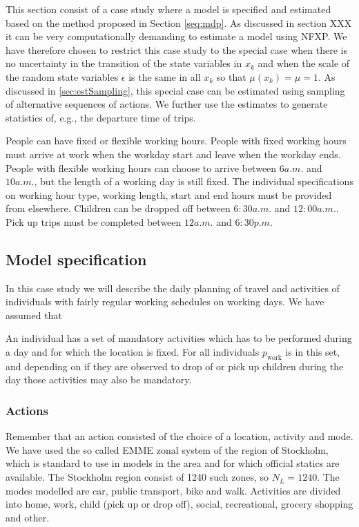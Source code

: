 This section consist of a case study where a model is specified and estimated based on the method proposed in Section \ref{seq:mdp}.
As discussed in section XXX %
it can be very computationally demanding to estimate a model using NFXP. We have therefore chosen to restrict this case study to the special case when there is no uncertainty in the transition of the state variables in $x_k$ and when the scale of the random state variables $\epsilon$ is the same in all $x_k$ so that $\mu(x_k)=\mu=1$. As discussed in \ref{sec:estSampling}, this special case can be estimated using sampling of alternative sequences of actions. We further use the estimates to generate statistics of, e.g., the departure time of trips. 



People can have fixed or flexible working hours. People with fixed working hours must arrive at work when the workday start and leave when the workday ends. %
People with flexible working hours can choose to arrive between $6\unit{a.m.}$ and $10\unit{a.m.}$, but the length of a working day is still fixed. The individual specifications on working hour type, working length, start and end hours must be provided from elsewhere. Children can be dropped off between $6:30\unit{a.m.}$ and $12:00\unit{a.m.}$. Pick up trips must be completed between $12\unit{a.m.}$ and $6:30\unit{p.m.}$

\subsection{Model specification}
In this case study we will describe the daily planning of travel and activities of individuals with fairly regular working schedules on working days. We have assumed that 



\newcommand{\p}[1]{p_{\text{#1}}}
\newcommand{\m}[1]{m_{\text{#1}}}
\newcommand{\amemm}[1]{\amem_\text{#1}}


An individual has a set of mandatory activities which has to be performed during a day and for which the location is fixed. For all individuals $\p{work}$ is in this set, and depending on if they are observed to drop of or pick up children during the day those activities may also be mandatory.  
\subsubsection{Actions}
Remember that an action consisted of the choice of a location, activity and mode. We have used the so called EMME zonal system of the region of Stockholm, which is standard to use in models in the area and for which official statics are available. The Stockholm region consist of 1240 such zones, so $N_L = 1240$. The modes modelled are car, public transport, bike and walk. Activities are divided into home, work, child (pick up or drop off), social, recreational, grocery shopping and other.

